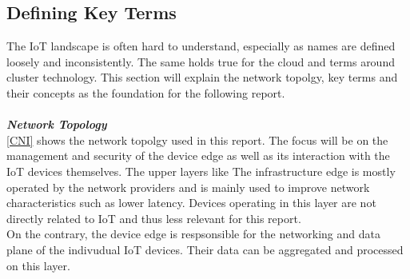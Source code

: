 \subsection{Defining Key Terms}
The IoT landscape is often hard to understand, especially as names are defined loosely and  inconsistently. The same holds true for the cloud and terms around cluster technology. This section will explain the network topolgy, key terms and their concepts as the foundation for the following report.\\

\vspace{0.5mm}\\
\textbf\textit{Network Topology}\\
\cref{CNI} shows the network topolgy used in this report. The focus will be on the management and security of the device edge as well as its interaction with the IoT devices themselves. The upper layers like 
The infrastructure edge is mostly operated by the network providers and is mainly used to improve network characteristics such as lower latency. Devices operating in this layer are not directly related to IoT and thus less relevant for this report.\\
On the contrary, the device edge is respsonsible for the networking and data plane of the indivudual IoT devices. Their data can be aggregated and processed on this layer. 

